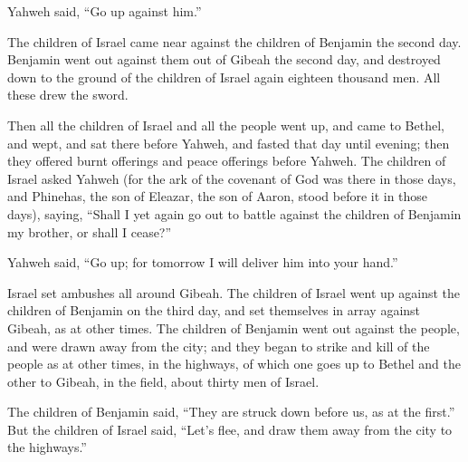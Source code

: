 Yahweh said, ``Go up against him.''

 The children of Israel came near against the children of
Benjamin the second day.  Benjamin went out against them
out of Gibeah the second day, and destroyed down to the ground of the
children of Israel again eighteen thousand men. All these drew the
sword.

 Then all the children of Israel and all the people went
up, and came to Bethel, and wept, and sat there before Yahweh, and
fasted that day until evening; then they offered burnt offerings and
peace offerings before Yahweh.  The children of Israel
asked Yahweh (for the ark of the covenant of God was there in those
days,  and Phinehas, the son of Eleazar, the son of Aaron,
stood before it in those days), saying, ``Shall I yet again go out to
battle against the children of Benjamin my brother, or shall I cease?''

Yahweh said, ``Go up; for tomorrow I will deliver him into your hand.''

 Israel set ambushes all around Gibeah.  The
children of Israel went up against the children of Benjamin on the third
day, and set themselves in array against Gibeah, as at other times.
 The children of Benjamin went out against the people, and
were drawn away from the city; and they began to strike and kill of the
people as at other times, in the highways, of which one goes up to
Bethel and the other to Gibeah, in the field, about thirty men of
Israel.

 The children of Benjamin said, ``They are struck down
before us, as at the first.'' But the children of Israel said, ``Let's
flee, and draw them away from the city to the highways.''

